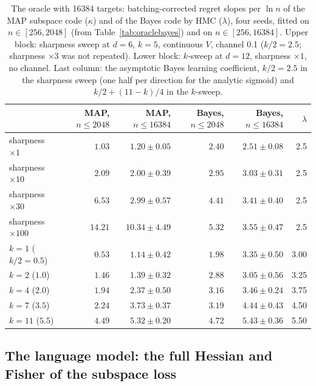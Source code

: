 \documentclass[11pt,a4paper]{article}
\begin{document}
\begin{table}[t]
\centering
\footnotesize
\caption{The oracle with 16384 targets: batching-corrected regret slopes per $\ln n$ of the MAP subspace code ($\kappa$) and of the Bayes code by HMC ($\lambda$), four seeds, fitted on $n\in[256,2048]$ (from Table~\ref{tab:oraclebayes}) and on $n\in[256,16384]$. Upper block: sharpness sweep at $d=6$, $k=5$, continuous $V$, channel 0.1 ($k/2=2.5$; sharpness $\times3$ was not repeated). Lower block: $k$-sweep at $d=12$, sharpness $\times1$, no channel. Last column: the asymptotic Bayes learning coefficient, $k/2=2.5$ in the sharpness sweep (one half per direction for the analytic sigmoid) and $k/2+(11-k)/4$ in the $k$-sweep.}
\label{tab:oracle16384}
\begin{tabular}{lrrrrr}
\toprule
 & MAP, $n\le2048$ & MAP, $n\le16384$ & Bayes, $n\le2048$ & Bayes, $n\le16384$ & $\lambda$\\
\midrule
sharpness $\times1$ & $1.03$ & $1.20\pm0.05$ & $2.40$ & $2.51\pm0.08$ & 2.5\\
sharpness $\times10$ & $2.09$ & $2.00\pm0.39$ & $2.95$ & $3.03\pm0.31$ & 2.5\\
sharpness $\times30$ & $6.53$ & $2.99\pm0.57$ & $4.41$ & $3.41\pm0.40$ & 2.5\\
sharpness $\times100$ & $14.21$ & $10.34\pm4.49$ & $5.32$ & $3.55\pm0.47$ & 2.5\\
\midrule
$k=1$ ($k/2=0.5$) & $0.53$ & $1.14\pm0.42$ & $1.98$ & $3.35\pm0.50$ & 3.00\\
$k=2$ ($1.0$) & $1.46$ & $1.39\pm0.32$ & $2.88$ & $3.05\pm0.56$ & 3.25\\
$k=4$ ($2.0$) & $1.94$ & $2.37\pm0.50$ & $3.16$ & $3.46\pm0.24$ & 3.75\\
$k=7$ ($3.5$) & $2.24$ & $3.73\pm0.37$ & $3.19$ & $4.44\pm0.43$ & 4.50\\
$k=11$ ($5.5$) & $4.49$ & $5.32\pm0.20$ & $4.72$ & $5.43\pm0.36$ & 5.50\\
\bottomrule
\end{tabular}
\end{table}

\subsection{The language model: the full Hessian and Fisher of the subspace loss}
\label{sec:coef:gpt2}
\end{document}
